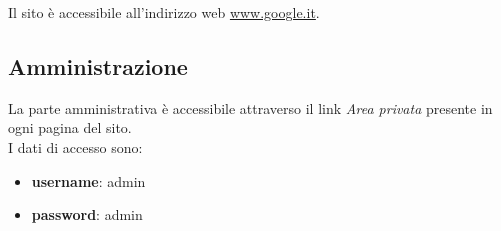 Il sito \`e accessibile all'indirizzo web \href{www.google.it}{www.google.it}.

\subsection{Amministrazione}
La parte amministrativa \`e accessibile attraverso il link \textit{Area privata} presente in ogni pagina del sito. \\ I dati di accesso sono:
\begin{itemize}
	\item \textbf{username}: admin
	\item \textbf{password}: admin
\end{itemize}